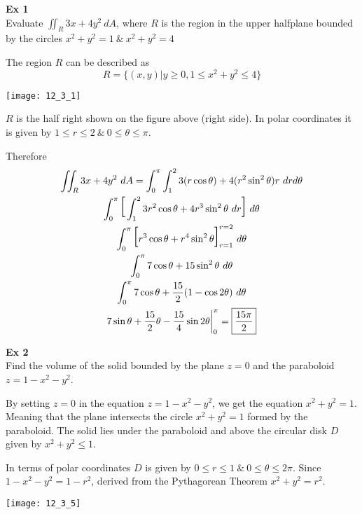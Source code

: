 \documentclass{article}
\begin{document}
  \textbf{Ex 1}\\
  Evaluate $ \iint_R 3x+4y^{2}~dA $, where $ R $ is the region in the  upper halfplane bounded by the circles $ x^{2}+y^{2}=1 ~\&~ x^{2}+y^{2}=4 $

  The region $ R $ can be described as
  \[
    R=\{ (x,y) | y \ge 0, 1 \le x^{2}+y^{2} \le 4 \}
  \]

  \begin{center}
    \texttt{[image: 12\_3\_1]}
  \end{center}

  $ R $ is the half right shown on the figure above (right side). In polar coordinates it is given by $ 1 \le r \le 2 ~\&~ 0 \le \theta \le \pi $.

  Therefore
  \[
    \begin{gathered}
    \iint_R 3x+4y^{2}~dA = \int^{\pi}_{0} \int^{2}_{1} 3(r\cos{\theta})+4(r^{2}\sin^{2}{\theta})r ~ dr d\theta\\
    \int^{\pi}_{0} \text{\huge{[}} \int^{2}_{1} 3r^{2}\cos{\theta}+4r^{3}\sin^{2}{\theta}~dr \text{\huge{]}} ~ d\theta\\
    \int^{\pi}_{0} \text{\huge{[}} r^{3}\cos{\theta}+r^{4}\sin^{2}{\theta} \text{\huge{]}}^{r=2}_{r=1}~d\theta\\
    \int^{\pi}_{0} 7\cos{\theta}+15\sin^{2}{\theta}~d\theta\\
    \int^{\pi}_{0} 7\cos{\theta}+\frac{15}{2}(1-\cos{2\theta})~d\theta\\
    7\sin{\theta}+\frac{15}{2}\theta-\frac{15}{4}\sin{2\theta} \bigg|^{\pi}_0=\boxed{\frac{15\pi}{2}}
    \end{gathered}
  \]

  \textbf{Ex 2}\\
  Find the volume of the solid bounded by the plane $ z=0 $ and the paraboloid $ z=1-x^{2}-y^{2} $.

  By setting $ z=0 $ in the equation $ z=1-x^{2}-y^{2} $, we get the equation $ x^{2}+y^{2}=1 $. Meaning that the plane intersects the circle $ x^{2}+y^{2}=1 $ formed by the paraboloid. The solid lies under the paraboloid and above the circular disk $ D $ given by $ x^{2}+y^{2} \le 1 $.

  In terms of polar coordinates $ D $ is given by $ 0 \le r \le 1 ~\&~ 0 \le \theta \le 2\pi $. Since $ 1-x^{2}-y^{2}=1 - r^{2} $, derived from the Pythagorean Theorem $ x^{2}+y^{2}=r^{2} $.

  \begin{center}
    \texttt{[image: 12\_3\_5]}
  \end{center}
\end{document}
